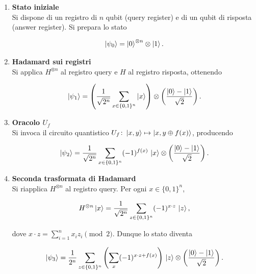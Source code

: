 \documentclass[a4paper,12pt]{report}
\theoremstyle{plain}
\begin{document}
\begin{enumerate}
    \item \textbf{Stato iniziale} \\
    Si dispone di un registro di $n$ qubit (query register) e di un qubit di risposta (answer register). Si prepara lo stato
    
    \begin{equation}
    \ket{\psi_0}
    = \ket{0}^{\otimes n} \otimes \ket{1}.
    \end{equation}
    
    \item \textbf{Hadamard sui registri} \\
    Si applica $H^{\otimes n}$ al registro query e $H$ al registro risposta, ottenendo
    
    \begin{equation}
    \ket{\psi_1}
    = \left(\frac{1}{\sqrt{2^n}}\sum_{x\in\{0,1\}^n}\ket{x}\right)
      \otimes
      \left(\frac{\ket{0} - \ket{1}}{\sqrt{2}}\right).
    \end{equation}
    
    \item \textbf{Oracolo $U_f$} \\
    Si invoca il circuito quantistico $U_f\colon\ket{x,y}\mapsto\ket{x,y\oplus f(x)}$, producendo
    
    \begin{equation}
    \ket{\psi_2}
    = \frac{1}{\sqrt{2^n}}
      \sum_{x\in\{0,1\}^n}(-1)^{f(x)}\,\ket{x}
      \otimes
      \left(\frac{\ket{0} - \ket{1}}{\sqrt{2}}\right).
    \end{equation}
    
    \item \textbf{Seconda trasformata di Hadamard} \\
    Si riapplica $H^{\otimes n}$ al registro query. Per ogni $x\in\{0,1\}^n$,
    
    \begin{equation}
    H^{\otimes n}\ket{x}
    = \frac{1}{\sqrt{2^n}}
      \sum_{z\in\{0,1\}^n}(-1)^{x\cdot z}\,\ket{z},
    \end{equation}
    
    dove $x\cdot z=\sum_{i=1}^n x_i z_i \pmod{2}$. Dunque lo stato diventa
    
    \begin{equation}
    \ket{\psi_3}
    = \frac{1}{2^n}
      \sum_{z\in\{0,1\}^n}
      \left(\sum_{x}(-1)^{x\cdot z + f(x)}\right)\,\ket{z}
      \otimes
      \left(\frac{\ket{0} - \ket{1}}{\sqrt{2}}\right).
    \end{equation}
    

\end{enumerate}
\end{document}
